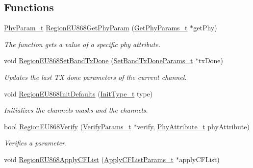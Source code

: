 \subsection*{Functions}
\begin{DoxyCompactItemize}
\item 
\hyperlink{group__REGION_gaed159b26e5c4677236b6e8677019db30}{Phy\+Param\+\_\+t} \hyperlink{group__REGIONEU868_ga4150dec3b05b9774aedf4e2e32499fd3}{Region\+E\+U868\+Get\+Phy\+Param} (\hyperlink{group__REGION_gab471483fff904f4f89bbc03f7fc380ab}{Get\+Phy\+Params\+\_\+t} $\ast$get\+Phy)
\begin{DoxyCompactList}\small\item\em The function gets a value of a specific phy attribute. \end{DoxyCompactList}\item 
void \hyperlink{group__REGIONEU868_ga5cf25bd6be48790f3f637d60a236fdb1}{Region\+E\+U868\+Set\+Band\+Tx\+Done} (\hyperlink{group__REGION_gad0524aa0673c0814a71e7a4f9cade3fc}{Set\+Band\+Tx\+Done\+Params\+\_\+t} $\ast$tx\+Done)
\begin{DoxyCompactList}\small\item\em Updates the last TX done parameters of the current channel. \end{DoxyCompactList}\item 
void \hyperlink{group__REGIONEU868_ga3e8ada4579aff33ad74ca34513d64893}{Region\+E\+U868\+Init\+Defaults} (\hyperlink{group__REGION_gaddc73ae10673ec925724e7870363bda9}{Init\+Type\+\_\+t} type)
\begin{DoxyCompactList}\small\item\em Initializes the channels masks and the channels. \end{DoxyCompactList}\item 
bool \hyperlink{group__REGIONEU868_ga66189a5f3ba138e24f8033d55e9b72a7}{Region\+E\+U868\+Verify} (\hyperlink{group__REGION_ga966d97bc2f25df1c09e92e60ef652276}{Verify\+Params\+\_\+t} $\ast$verify, \hyperlink{group__REGION_ga9445b07fdf77581ecfaf389970e635f8}{Phy\+Attribute\+\_\+t} phy\+Attribute)
\begin{DoxyCompactList}\small\item\em Verifies a parameter. \end{DoxyCompactList}\item 
void \hyperlink{group__REGIONEU868_ga87e838c747c248c577a44329c0013988}{Region\+E\+U868\+Apply\+C\+F\+List} (\hyperlink{group__REGION_ga71588e9ad07e34b78fa91d51881fd3c6}{Apply\+C\+F\+List\+Params\+\_\+t} $\ast$apply\+C\+F\+List)

\end{DoxyCompactItemize}
